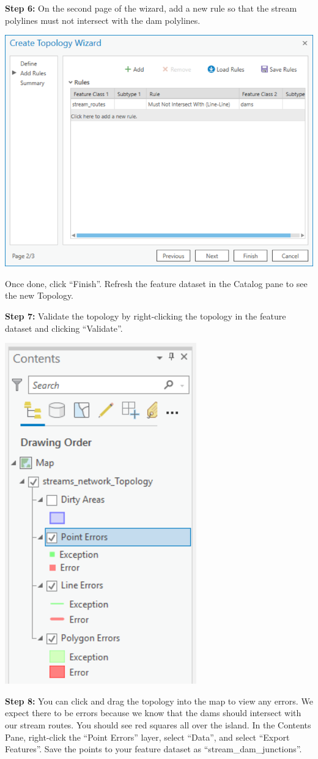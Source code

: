 \documentclass[
]{book}
\begin{document}
\textbf{Step 6:} On the second page of the wizard, add a new rule so that the stream polylines must not intersect with the dam polylines.

\includegraphics[width=1\linewidth]{images/02-create-topology-2}

Once done, click ``Finish''. Refresh the feature dataset in the Catalog pane to see the new Topology.

\textbf{Step 7:} Validate the topology by right-clicking the topology in the feature dataset and clicking ``Validate''.

\includegraphics[width=0.25\linewidth]{images/02-topology-errors}

\textbf{Step 8:} You can click and drag the topology into the map to view any errors. We expect there to be errors because we know that the dams should intersect with our stream routes. You should see red squares all over the island. In the Contents Pane, right-click the ``Point Errors'' layer, select ``Data'', and select ``Export Features''. Save the points to your feature dataset as ``stream\_dam\_junctions''.
\end{document}
